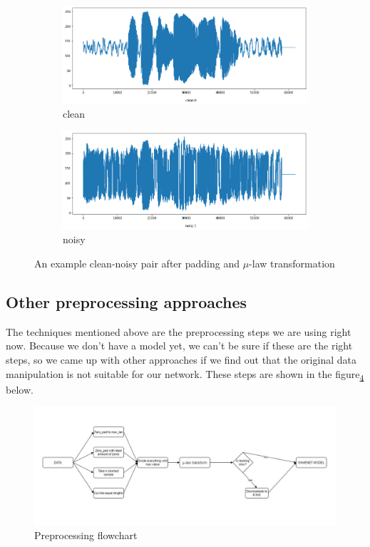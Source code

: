 \documentclass[12pt]{article}
\begin{document}
	\begin{figure}[H]
		\centering
		\begin{subfigure}{.5\textwidth}
			\centering
			\includegraphics[width=.8\linewidth]{wave_clean_padded_mulaw}
			\caption{clean}
			\label{fig:wave_clean_padded_mulaw}
		\end{subfigure}%
		\begin{subfigure}{.5\textwidth}
			\centering
			\includegraphics[width=.8\linewidth]{wave_noisy_padded_mulaw}
			\caption{noisy}
			\label{fig:wave_noisy_padded_mulaw}
		\end{subfigure}
		\caption{An example clean-noisy pair after padding and $\mu$-law transformation}
		\label{fig:clean_noisy_padded_mulaw}
	\end{figure}
	
	
	
	\subsection{Other preprocessing approaches}
	
	The techniques mentioned above are the preprocessing steps we are using right now. Because we don't have a model yet, we can't be sure if these are the right steps, so we came up with other approaches if we find out that the original data manipulation is not suitable for our network. These steps are shown in the figure\textsubscript{\ref{fig:DataToModelPic}} below.
	
	\begin{figure}[H]
	\centering

		\centering
		\includegraphics[width=1\linewidth]{DataToModelPic}
		\caption{Preprocessing flowchart}
		\label{fig:DataToModelPic}
	\end{figure}
\end{document}
